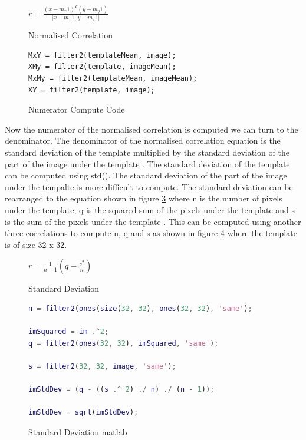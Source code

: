 \documentclass{article}
\begin{document}
\begin{figure}[H]
\begin{center}
$r=\frac{(x-m_x1)^T(y-m_y1)}{|x-m_x1||y-m_x1|}$
\end{center}
\caption{Normalised Correlation}
\label{fig:normcoreq}
\end{figure}

\begin{figure}[H]
\begin{lstlisting}
MxY = filter2(templateMean, image);
XMy = filter2(template, imageMean);
MxMy = filter2(templateMean, imageMean);
XY = filter2(template, image);
\end{lstlisting}
\caption{Numerator Compute Code}
\label{fig:numerator}
\end{figure}

Now the numerator of the normalised correlation is computed we can turn to the
denominator. The denominator of the normalised correlation equation is the
standard deviation of the template multiplied by the standard deviation of the part of the image under the template \cite{crosscor}.
The standard deviation of the template can be computed using std(). The standard
deviation of the part of the image under the tempalte is more difficult to compute. The standard deviation can be
rearranged to the equation shown in figure \ref{fig:stddeveq} where n is the
number of pixels under the template, q is the squared sum of the pixels under the
template and s is the sum of the pixels under the template \cite{stddev}. This can
be computed using another three correlations to compute n, q and s as shown in
figure \ref{fig:stddeccode} where the template is of size 32 x 32.\\

\begin{figure}[H]
\begin{center}
$r=\frac{1}{n - 1}(q - \frac{s^2}{n})$
\end{center}
\caption{Standard Deviation}
\label{fig:stddeveq}
\end{figure}

\begin{figure}[H]
\begin{lstlisting}[language=matlab]
n = filter2(ones(size(32, 32), ones(32, 32), 'same');

imSquared = im .^2;
q = filter2(ones(32, 32), imSquared, 'same');

s = filter2(32, 32, image, 'same');

imStdDev = (q - ((s .^ 2) ./ n) ./ (n - 1));

imStdDev = sqrt(imStdDev);
\end{lstlisting}
\caption{Standard Deviation matlab}
\label{fig:stddeccode}
\end{figure}
\end{document}
